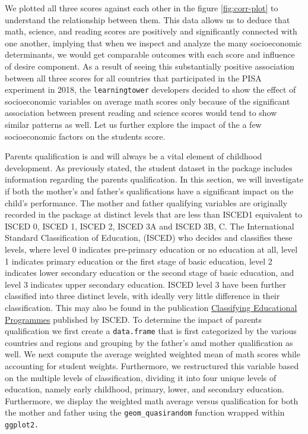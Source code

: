 We plotted all three scores against each other in the figure
\ref{fig:corr-plot} to understand the relationship between them. This
data allows us to deduce that math, science, and reading scores are
positively and significantly connected with one another, implying that
when we inspect and analyze the many socioeconomic determinants, we
would get comparable outcomes with each score and influence of desire
component. As a result of seeing this substantially positive association
between all three scores for all countries that participated in the PISA
experiment in 2018, the \texttt{learningtower} developers decided to
show the effect of socioeconomic variables on average math scores only
because of the significant association between present reading and
science scores would tend to show similar patterns as well. Let us
further explore the impact of the a few socioeconomic factors on the
students score.

Parents qualification is and will always be a vital element of childhood
development. As previously stated, the student dataset in the package
includes information regarding the parents qualification. In this
section, we will investigate if both the mother's and father's
qualifications have a significant impact on the child's performance. The
mother and father qualifying variables are originally recorded in the
package at distinct levels that are less than ISCED1 equivalent to ISCED
0, ISCED 1, ISCED 2, ISCED 3A and ISCED 3B, C. The International
Standard Classification of Education, (ISCED) who decides and classifies
these levels, where level 0 indicates pre-primary education or no
education at all, level 1 indicates primary education or the first stage
of basic education, level 2 indicates lower secondary education or the
second stage of basic education, and level 3 indicates upper secondary
education. ISCED level 3 have been further classified into three
distinct levels, with ideally very little difference in their
classification. This may also be found in the publication
\href{https://www.oecd.org/education/1841854.pdf}{Classifying
Educational Programmes} published by ISCED. To determine the impact of
parents qualification we first create a \texttt{data.frame} that is
first categorized by the various countries and regions and grouping by
the father's amd mother qualification as well. We next compute the
average weighted weighted mean of math scores while accounting for
student weights. Furthermore, we restructured this variable based on the
multiple levels of classification, dividing it into four unique levels
of education, namely early childhood, primary, lower, and secondary
education. Furthermore, we display the weighted math average versus
qualification for both the mother and father using the
\texttt{geom\_quasirandom} function wrapped within \texttt{ggplot2.}

